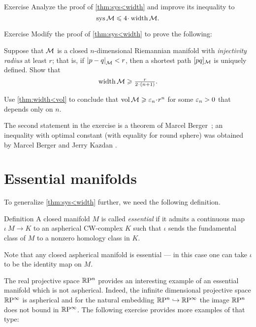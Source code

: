 \begin{thm}{Exercise}\label{ex:sys<width}
Analyze the proof of \ref{thm:sys<width} and improve its inequality to 
 \[\sys\spc{M}\le 4 \cdot \width \spc{M}.\]
\end{thm}

\begin{thm}{Exercise}\label{ex:fillrad-inj}
Modify the proof of \ref{thm:sys<width} to prove the following:

Suppose that $\mathcal{M}$ is a closed $n$-dimensional Riemannian manifold with \emph{injectivity radius} at least $r$; that is, if $\dist{p}{q}{\spc{M}}<r$, then a shortest path $[pq]_{\mathcal{M}}$ is uniquely defined.
Show that
\[\width\spc{M}\ge \tfrac{r}{2\cdot(n+1)}.\]

Use \ref{thm:width<vol} to conclude that $\vol\spc{M}\ge \eps_n \cdot r^n$
for some $\varepsilon_n>0$ that depends only on $n$.
\end{thm} 

The second statement in the exercise is a theorem of Marcel Berger~\cite{berger-n};
an inequality with optimal constant (with equality for round sphere) was obtained by Marcel Berger and Jerry Kazdan \cite{berger-kazdan}. 


\section{Essential manifolds}

To generalize \ref{thm:sys<width} further, we need the following definition.

\begin{thm}{Definition}\label{def:essential}
A closed manifold $M$ is called \emph{essential} if it admits a continuous map $\iota\:M\to K$ to an aspherical CW-complex $K$ such that $\iota$ sends the fundamental class of $M$ to a nonzero homology class in $K$.
\end{thm}

Note that any closed aspherical manifold is essential --- in this case one can take $\iota$ to be the identity map on $M$.

The real projective space $\mathbb{R}\mathrm{P}^n$ provides an interesting example of an essential manifold which is not aspherical.
Indeed, the infinite dimensional projective space $\mathbb{R}\mathrm{P}^\infty$ is aspherical and for the natural embedding $\mathbb{R}\mathrm{P}^n\hookrightarrow\mathbb{R}\mathrm{P}^\infty$ the image $\mathbb{R}\mathrm{P}^n$ does not bound in $\mathbb{R}\mathrm{P}^\infty$.
The following exercise provides more examples of that type:

